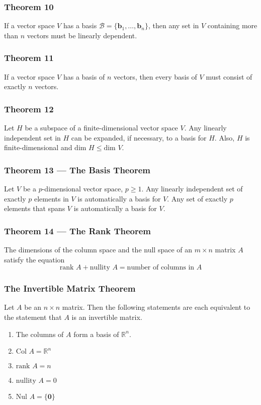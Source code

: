 \documentclass{article}
\begin{document}
\subsubsection*{Theorem 10}
If a vector space $V$ has a basis $\mathcal{B}=\{\mathbf{b}_1,\ldots, \mathbf{b}_n\}$, then any set
in $V$ containing more than $n$ vectors must be linearly dependent.

\subsubsection*{Theorem 11}
If a vector space $V$ has a basis of $n$ vectors, then every basis of $V$ must consist of exactly
$n$ vectors.

\subsubsection*{Theorem 12}
Let $H$ be a subspace of a finite-dimensional vector space $V$. Any linearly independent set in $H$
can be expanded, if necessary, to a basis for $H$. Also, $H$ is finite-dimensional and
$\text{dim }H\leq \text{dim }V$.

\subsubsection*{Theorem 13 --- The Basis Theorem}
Let $V$ be a $p$-dimensional vector space, $p\geq 1$. Any linearly independent set of exactly $p$
elements in $V$ is automatically a basis for $V$. Any set of exactly $p$ elements that spans $V$ is
automatically a basis for $V$.

\subsubsection*{Theorem 14 --- The Rank Theorem}
The dimensions of the column space and the null space of an $m\times n$ matrix $A$ satisfy the
equation
\[\text{rank }A+\text{nullity }A=\text{number of columns in }A\]

\subsubsection*{The Invertible Matrix Theorem}
Let $A$ be an $n\times n$ matrix. Then the following statements are each equivalent to the
statement that $A$ is an invertible matrix.
\begin{enumerate}
    \item The columns of $A$ form a basis of $\mathbb{R}^n$.
    \item $\text{Col }A=\mathbb{R}^n$
    \item $\text{rank }A=n$
    \item $\text{nullity }A=0$
    \item $\text{Nul }A=\{\mathbf{0}\}$
\end{enumerate}
\end{document}

